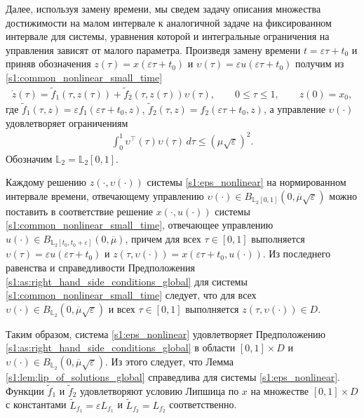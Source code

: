 \documentclass[../main.tex]{subfiles}
\begin{document}
    
Далее, используя замену времени, мы сведем задачу описания множества достижимости на малом интервале к аналогичной задаче на фиксированном интервале для системы, уравнения которой и интегральные ограничения на управления зависят от малого параметра.
Произведя замену времени $ t = \varepsilon \tau + t_0 $ и приняв обозначения $ z(\tau) = x(\varepsilon \tau + t_0) $ и $ \upsilon(\tau) = \varepsilon u(\varepsilon \tau + t_0) $  получим из \eqref{s1:common_nonlinear_small_time}
\begin{gather}\label{s1:eps_nonlinear}
    \dot{z}(\tau)=\widetilde{f}_1(\tau,z(\tau))+\widetilde{f}_2(\tau,z(\tau))\upsilon(\tau), \qquad 0 \leqslant \tau \leqslant 1, \qquad z(0) = x_0,
\end{gather}
где $ \widetilde{f}_1(\tau,z) = \varepsilon f_1(\varepsilon \tau + t_0,z) $, $ \widetilde{f}_2 (\tau,z) = f_2(\varepsilon \tau + t_0,z)$, а управление $ \upsilon(\cdot) $ удовлетворяет ограничениям
\begin{gather*}%
    \int_0^1 \upsilon^{\top}(\tau) \upsilon(\tau) \, d\tau \leqslant \left( \mu \sqrt{\varepsilon}\right)^2.
\end{gather*}
Обозначим $\mathbb{L}_2 = \mathbb{L}_2[0, 1]$. 

Каждому решению $z(\cdot, \upsilon(\cdot))$ системы \eqref{s1:eps_nonlinear} на нормированном интервале времени, отвечающему управлению $\upsilon(\cdot) \in B_{\mathbb{L}_2[0, 1]} (0, \overline{\mu} \sqrt{\varepsilon})$ можно поставить в соответствие решение $x(\cdot, u(\cdot))$ системы \eqref{s1:common_nonlinear_small_time}, отвечающее управлению $u(\cdot) \in B_{\mathbb{L}_2[t_0, t_0 + \varepsilon]} (0, \overline{\mu})$, причем для всех $\tau \in [0, 1] $ выполняется $ \upsilon(\tau) = \varepsilon u(\varepsilon \tau + t_0)$ и $ z(\tau, \upsilon(\cdot)) = x(\varepsilon \tau + t_0, u(\cdot)) $.
Из последнего равенства и справедливости Предположения \ref{s1:as:right_hand_side_conditions_global} для системы \eqref{s1:common_nonlinear_small_time} следует, что для всех  $\upsilon(\cdot) \in B_{\mathbb{L}_2}(0, \overline{\mu}\sqrt{\varepsilon})$ и всех $\tau \in [0, 1] $ выполняется $z(\tau, \upsilon(\cdot)) \in D$. 

Таким образом, система \eqref{s1:eps_nonlinear}  удовлетворяет Предположению  \ref{s1:as:right_hand_side_conditions_global} в области $[0, 1]\times D$ и $\upsilon(\cdot) \in B_{\mathbb{L}_2}(0, \overline{\mu}\sqrt{\varepsilon}) $.
Из этого следует, что Лемма \ref{s1:lem:lip_of_solutions_global} справедлива для системы  \eqref{s1:eps_nonlinear}.
Функции  $\widetilde{f}_1$ и $\widetilde{f}_2$ удовлетворяют условию Липшица по $x$ на множестве $[0, 1]\times D$ с константами $\widetilde{L}_{f_1} = \varepsilon L_{f_1} $ и  $\widetilde{L}_{f_2} = L_{f_2} $ соответственно. 
\end{document}
